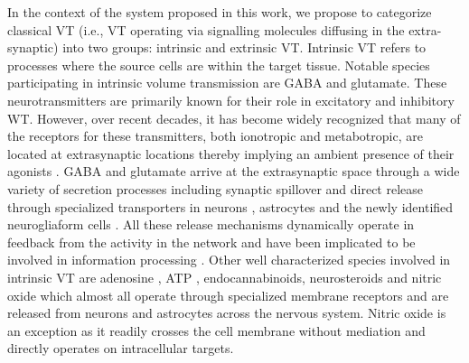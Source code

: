     In the context of the system proposed in this work, we propose to categorize classical VT (i.e., VT operating via signalling molecules diffusing in the extra-synaptic) into two groups: intrinsic and extrinsic VT. Intrinsic VT refers to processes where the source cells are within the target tissue. Notable species participating in intrinsic volume transmission are GABA and glutamate. These neurotransmitters are primarily known for their role in excitatory and inhibitory WT. However, over recent decades, it has become widely recognized that many of the receptors for these transmitters, both ionotropic and metabotropic, are located at extrasynaptic locations thereby implying an ambient presence of their agonists \cite{farrant2005variations,taber2014volume}. GABA and glutamate arrive at the extrasynaptic space through a wide variety of secretion processes including synaptic spillover \cite{matsui2003ectopic,hamann2002tonic,bellamy2006interactions} and direct release through specialized transporters in neurons \cite{cavelier2005tonic}, astrocytes \cite{lee2010channel,cavelier2005DIDS} and the newly identified neurogliaform cells \cite{olah2009regulation}. All these release mechanisms dynamically operate in feedback from the activity in the network and have been implicated to be involved in information processing \cite{mann2010control,hamann2002tonic,lenk2016understanding,cavelier2005tonic}. Other well characterized species involved in intrinsic VT are adenosine \cite{wall2015localized}, ATP \cite{zhang2003atp}, endocannabinoids, neurosteroids and nitric oxide \cite{fuxe2010discovery,bellamy2000rapid} which almost all operate through specialized membrane receptors and are released from neurons and astrocytes across the nervous system. Nitric oxide is an exception as it readily crosses the cell membrane without mediation and directly operates on intracellular targets.

